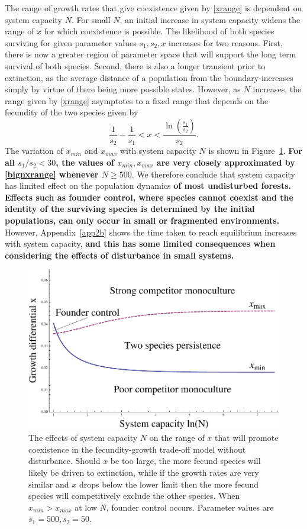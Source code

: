 The range of growth rates that give coexistence given by \eqref{xrange} is dependent on system capacity $N$. For small $N$, an initial increase in system capacity widens the range of $x$ for which coexistence is possible. The likelihood of both species surviving for given parameter values $s_1,s_2,x$ increases for two reasons. First, there is now a greater region of parameter space that will support the long term survival of both species. Second, there is also a longer transient prior to extinction, as the average distance of a population from the boundary increases simply by virtue of there being more possible states. 
 However, as $N$ increases, the range given by \eqref{xrange} asymptotes to a fixed range that  depends on the fecundity of the two species given by
\begin{equation}
\label{bignxrange}
\frac{1}{s_2}-\frac{1}{s_1}<x<\frac{\ln\left(\frac{s_1}{s_2}\right)}{s_2}.
\end{equation}  
The variation of $x_{min}$ and $x_{max}$ with system capacity $N$ is shown in Figure~\ref{fig:systemsize}. \textbf{For all $s_1/s_2<30$, the values of $x_{min},x_{max}$ are very closely approximated by \eqref{bignxrange} whenever $N\geq 500$}. We therefore conclude that system capacity has limited effect on the population dynamics \textbf{of most undisturbed forests. Effects such as founder control, where species cannot coexist and the identity of the surviving species is determined by the initial populations, can only occur in small or fragmented environments.}
 However, Appendix~\ref{app2b} shows the time taken to reach equilibrium increases with system capacity, \textbf{and this has some limited consequences when considering the effects of disturbance in small systems.}
\begin{figure}
  \includegraphics[width=4.5in]{xrangeofcoexist}
   \caption[Range of parameters giving coexistence without disturbance]{The effects of system capacity $N$ on the range of $x$ that will promote coexistence in the fecundity-growth trade-off model without disturbance. Should $x$ be too large, the more fecund species will likely be driven to extinction, while if the growth rates are very similar and $x$ drops below the lower limit then the more fecund species will competitively exclude the other species. When $x_{min}>x_{max}$ at low $N$, founder control occurs. Parameter values are $s_1=500,s_2=50$.}
 \label{fig:systemsize}
\end{figure}

